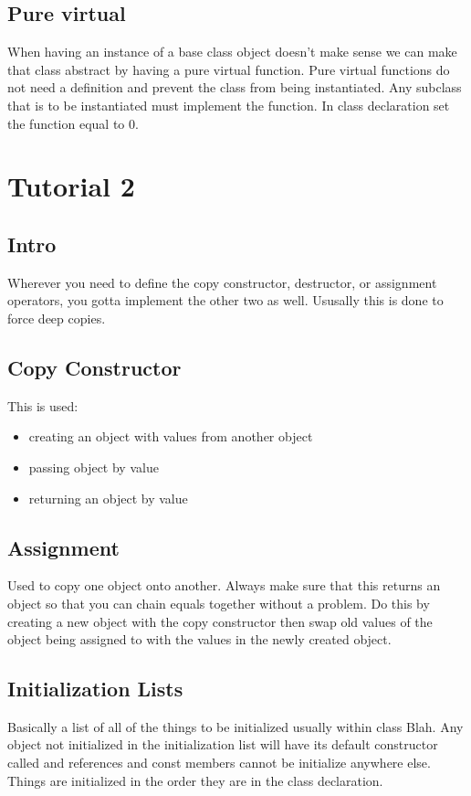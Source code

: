\documentclass[12pt]{article}
\begin{document}
\subsection{Pure virtual}

When having an instance of a base class object doesn't make sense we can make that class abstract by having a pure virtual function. Pure virtual functions do not need a definition and prevent the class from being instantiated. Any subclass that is to be instantiated must implement the function. In class declaration set the function equal to 0.


\section*{Tutorial 2}
\subsection*{Intro}
Wherever you need to define the copy constructor, destructor, or assignment operators, you gotta implement the other two as well. Ususally this is done to force deep copies.
\subsection*{Copy Constructor}
This is used:
\begin{itemize}
\item creating an object with values from another object
\item passing object by value
\item returning an object by value
\end{itemize}

\subsection*{Assignment}
Used to copy one object onto another. Always make sure that this returns an object so that you can chain equals together without a problem. Do this by creating a new
object with the copy constructor then swap old values of the object being assigned to with the values in the newly created object.

\subsection*{Initialization Lists}
Basically a list of all of the things to be initialized usually within class Blah{}.  Any object not initialized in the initialization list will have its default constructor called and references and const members cannot be initialize anywhere else. Things are initialized in the order they are in the class declaration.
 
\end{document}
